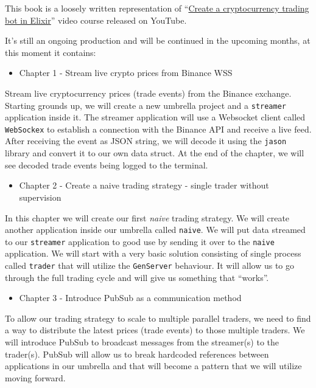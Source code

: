 \documentclass[
]{book}
\providecommand{\tightlist}{%
  \setlength{\itemsep}{0pt}\setlength{\parskip}{0pt}}
\begin{document}
This book is a loosely written representation of ``\href{https://www.youtube.com/watch?v=wVYIx7M6o28\&list=PLxsE19GnjC5Nv1CbeKOiS5YqGqw35aZFJ}{Create a cryptocurrency trading bot in Elixir}'' video course released on YouTube.

It's still an ongoing production and will be continued in the upcoming months, at this moment it contains:

\begin{itemize}
\tightlist
\item
  Chapter 1 - Stream live crypto prices from Binance WSS
\end{itemize}

Stream live cryptocurrency prices (trade events) from the Binance exchange. Starting grounds up, we will create a new umbrella project and a \texttt{streamer} application inside it. The streamer application will use a Websocket client called \texttt{WebSockex} to establish a connection with the Binance API and receive a live feed. After receiving the event as JSON string, we will decode it using the \texttt{jason} library and convert it to our own data struct. At the end of the chapter, we will see decoded trade events being logged to the terminal.

\begin{itemize}
\tightlist
\item
  Chapter 2 - Create a naive trading strategy - single trader without supervision
\end{itemize}

In this chapter we will create our first \emph{naive} trading strategy. We will create another application inside our umbrella called \texttt{naive}. We will put data streamed to our \texttt{streamer} application to good use by sending it over to the \texttt{naive} application. We will start with a very basic solution consisting of single process called \texttt{trader} that will utilize the \texttt{GenServer} behaviour. It will allow us to go through the full trading cycle and will give us something that ``works''.

\begin{itemize}
\tightlist
\item
  Chapter 3 - Introduce PubSub as a communication method
\end{itemize}

To allow our trading strategy to scale to multiple parallel traders, we need to find a way to distribute the latest prices (trade events) to those multiple traders. We will introduce PubSub to broadcast messages from the streamer(s) to the trader(s). PubSub will allow us to break hardcoded references between applications in our umbrella and that will become a pattern that we will utilize moving forward.
\end{document}
